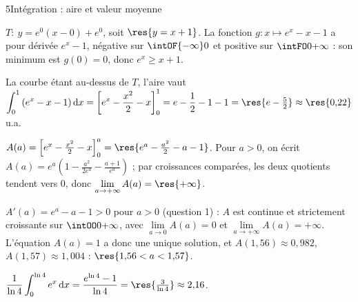 \begin{corrigeBac}{5}{Intégration : aire et valeur moyenne}
\begin{questions}
  \item $T:\ y=e^{0}(x-0)+e^{0}$, soit $\res{y=x+1}$. La fonction $g:x\mapsto e^{x}-x-1$ a pour dérivée $e^{x}-1$, négative sur
    $\intOF{-\infty}0$ et positive sur $\intFO0{+\infty}$ : son minimum est $g(0)=0$, donc $e^{x}\geq x+1$. \pts{1 pt}
  \item La courbe étant au-dessus de $T$, l'aire vaut $\displaystyle\int_0^1\left(e^{x}-x-1\right)\mathrm{d}x
    =\left[e^{x}-\frac{x^{2}}{2}-x\right]_0^1=e-\frac12-1-1=\res{e-\tfrac52}\approx\res{0{,}22}$ u.a. \pts{1 pt}
  \item $A(a)=\left[e^{x}-\frac{x^{2}}{2}-x\right]_0^{a}=\res{e^{a}-\tfrac{a^{2}}{2}-a-1}$. Pour $a>0$, on écrit
    $A(a)=e^{a}\left(1-\frac{a^{2}}{2e^{a}}-\frac{a+1}{e^{a}}\right)$ ; par croissances comparées, les deux quotients tendent vers $0$,
    donc $\lim\limits_{a\to+\infty}A(a)=\res{+\infty}$. \pts{1 pt}
  \item $A'(a)=e^{a}-a-1>0$ pour $a>0$ (question 1) : $A$ est continue et strictement croissante sur $\intOO0{+\infty}$, avec
    $\lim\limits_{a\to0}A(a)=0$ et $\lim\limits_{a\to+\infty}A(a)=+\infty$. L'équation $A(a)=1$ a donc une unique solution, et
    $A(1{,}56)\approx0{,}982$, $A(1{,}57)\approx1{,}004$ : $\res{1{,}56<a<1{,}57}$. 
  \item $\dfrac{1}{\ln4}\displaystyle\int_0^{\ln4}e^{x}\,\mathrm{d}x=\dfrac{e^{\ln4}-1}{\ln4}=\res{\tfrac{3}{\ln4}}\approx2{,}16$. 
\end{questions}
\end{corrigeBac}
